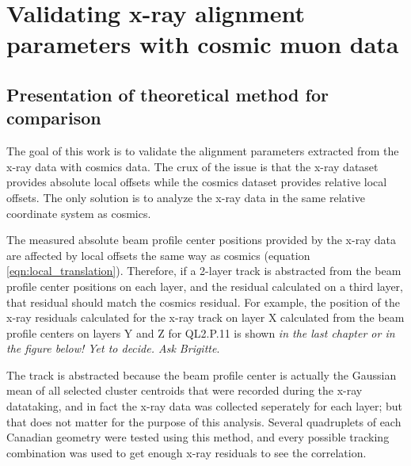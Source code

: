 
\chapter{Validating x-ray alignment parameters with cosmic muon data}
\label{chap:comparison}

\section{Presentation of theoretical method for comparison}

The goal of this work is to validate the alignment parameters extracted from the x-ray data with cosmics data. The crux of the issue is that the x-ray dataset provides absolute local offsets while the cosmics dataset provides relative local offsets. The only solution is to analyze the x-ray data in the same relative coordinate system as cosmics.

The measured absolute beam profile center positions provided by the x-ray data are affected by local offsets the same way as cosmics (equation \ref{eqn:local_translation}). Therefore, if a 2-layer track is abstracted from the beam profile center positions on each layer, and the residual calculated on a third layer, that residual should match the cosmics residual. For example, the position of the x-ray residuals calculated for the x-ray track on layer X calculated from the beam profile centers on layers Y and Z for QL2.P.11 is shown \textit{in the last chapter or in the figure below! Yet to decide. Ask Brigitte}. 


The track is abstracted because the beam profile center is actually the Gaussian mean of all selected cluster centroids that were recorded during the x-ray datataking, and in fact the x-ray data was collected seperately for each layer; but that does not matter for the purpose of this analysis. Several quadruplets of each Canadian geometry were tested using this method, and every possible tracking combination was used to get enough x-ray residuals to see the correlation. 

